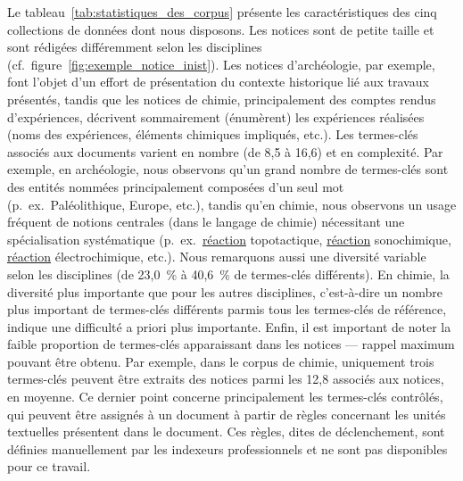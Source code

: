   Le tableau~\ref{tab:statistiques_des_corpus} présente les caractéristiques des
  cinq collections de données dont nous disposons. Les notices sont de petite
  taille et sont rédigées différemment selon les disciplines
  (cf.~figure~\ref{fig:exemple_notice_inist}). Les notices d'archéologie, par
  exemple, font l'objet d'un effort de présentation du contexte historique lié
  aux travaux présentés, tandis que les notices de chimie, principalement des
  comptes rendus d'expériences, décrivent sommairement (énumèrent) les
  expériences réalisées (noms des expériences, éléments chimiques impliqués,
  etc.). Les termes-clés associés aux documents varient en nombre (de 8,5 à
  16,6) et en complexité. Par exemple, en archéologie, nous observons qu'un
  grand nombre de termes-clés sont des entités nommées principalement composées
  d'un seul mot (p.~ex.~\og{}Paléolithique\fg{}, \og{}Europe\fg{}, etc.), tandis
  qu'en chimie, nous observons un usage fréquent de notions centrales (dans le
  langage de chimie) nécessitant une spécialisation systématique
  (p.~ex.~\og{}\underline{réaction} topotactique\fg{}, \og{}\underline{réaction}
  sonochimique\fg{}, \og{}\underline{réaction} électrochimique\fg{}, etc.).
  Nous remarquons aussi une diversité variable selon les disciplines (de 23,0~\%
  à 40,6~\% de termes-clés différents). En chimie, la diversité plus importante
  que pour les autres disciplines, c'est-à-dire un nombre plus important de
  termes-clés différents parmis tous les termes-clés de référence, indique une difficulté a priori plus
  importante. Enfin, il est important de noter la faible proportion de
  termes-clés apparaissant dans les notices --- rappel maximum pouvant être
  obtenu. Par exemple, dans le corpus de chimie, uniquement trois termes-clés
  peuvent être extraits des notices parmi les 12,8 associés aux notices, en
  moyenne. Ce dernier point concerne principalement les termes-clés contrôlés,
  qui peuvent être assignés à un document à partir de règles concernant les
  unités textuelles présentent dans le document. Ces règles, dites de
  déclenchement, sont définies manuellement par les indexeurs professionnels et
  ne sont pas disponibles pour ce travail.
